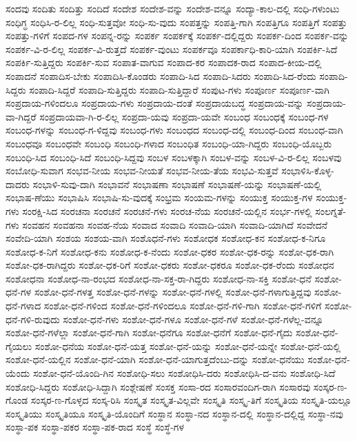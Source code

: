 {ಸಂದವು
ಸಂದಿತು
ಸಂದಿತ್ತು
ಸಂದಿದೆ
ಸಂದೇಶ
ಸಂದೇಶ-ವನ್ನು
ಸಂದೇಶ-ವನ್ನೂ
ಸಂದ್ಯಾ-ಕಾಲ-ದಲ್ಲಿ
ಸಂಧಿ-ಗಳುಂಟು
ಸಂಧಿಗ್ಧ
ಸಂಧಿಸಿ-ರ-ಲಿಲ್ಲ
ಸಂಧಿ-ಸುತ್ತವೋ
ಸಂಧಿ-ಸು-ವುದು
ಸಂಪತ್ತನ್ನು
ಸಂಪತ್ತಿ-ಗಾಗಿ
ಸಂಪತ್ತಿಗೂ
ಸಂಪತ್ತಿಗೆ
ಸಂಪತ್ತು
ಸಂಪತ್ತು-ಗಳಿಗೆ
ಸಂಪದ-ಗಳ
ಸಂಪನ್ನ-ರನ್ನು
ಸಂಪರ್ಕ
ಸಂಪರ್ಕಕ್ಕೆ
ಸಂಪರ್ಕ-ದಲ್ಲಿದ್ದರು
ಸಂಪರ್ಕ-ದಿಂದ
ಸಂಪರ್ಕ-ವನ್ನು
ಸಂಪರ್ಕ-ವಿ-ರ-ಲಿಲ್ಲ
ಸಂಪರ್ಕ-ವಿ-ರುತ್ತದೆ
ಸಂಪರ್ಕ-ವುಂಟು
ಸಂಪರ್ಕವೂ
ಸಂಪರ್ಕಾಧಿ-ಕಾರಿ-ಯಾಗಿ
ಸಂಪರ್ಕಿ-ಸಿದೆ
ಸಂಪರ್ಕಿ-ಸುತ್ತಿದ್ದರು
ಸಂಪರ್ಕಿ-ಸುವ
ಸಂಪಾತ-ವಾಗುವ
ಸಂಪಾದ-ಕರ
ಸಂಪಾದಕ-ರಾದ
ಸಂಪಾದ-ಕೀಯ-ದಲ್ಲಿ
ಸಂಪಾದನೆ
ಸಂಪಾದಿಸ-ಬೇಕು
ಸಂಪಾದಿಸಿ-ಕೊಂಡರು
ಸಂಪಾದಿ-ಸಿದ
ಸಂಪಾದಿ-ಸಿದರು
ಸಂಪಾದಿ-ಸಿದ-ರೆಂದು
ಸಂಪಾದಿ-ಸಿದ್ದರು
ಸಂಪಾದಿ-ಸಿದ್ದರೆ
ಸಂಪಾದಿ-ಸುತ್ತಿದ್ದರು
ಸಂಪಾದಿ-ಸುತ್ತಿದ್ದಾರೆ
ಸಂಪುಟ-ಗಳು
ಸಂಪೂರ್ಣ
ಸಂಪೂರ್ಣ-ವಾಗಿ
ಸಂಪ್ರದಾಯ-ಗಳಿಂದಲೂ
ಸಂಪ್ರದಾಯ-ಗಳು
ಸಂಪ್ರದಾಯ-ದಂತೆ
ಸಂಪ್ರದಾಯಬದ್ಧ
ಸಂಪ್ರದಾಯ-ವನ್ನು
ಸಂಪ್ರದಾಯ-ವಾ-ಗಿದ್ದರೆ
ಸಂಪ್ರದಾಯವಾ-ಗಿ-ರ-ಲಿಲ್ಲ
ಸಂಪ್ರದಾ-ಯವು
ಸಂಪ್ರದಾ-ಯವೇ
ಸಂಬಂಧ
ಸಂಬಂಧಕ್ಕೆ
ಸಂಬಂಧ-ಗಳ
ಸಂಬಂಧ-ಗಳನ್ನು
ಸಂಬಂಧ-ಗ-ಳಿದ್ದವು
ಸಂಬಂಧ-ಗಳು
ಸಂಬಂಧದ
ಸಂಬಂಧ-ದಲ್ಲಿ
ಸಂಬಂಧ-ದಿಂದ
ಸಂಬಂಧ-ವಾಗಿ
ಸಂಬಂಧವೂ
ಸಂಬಂಧವೇ
ಸಂಬಂಧಿ
ಸಂಬಂಧಿ-ಗಳಾದ
ಸಂಬಂಧಿತ
ಸಂಬಂಧಿ-ಯಾ-ಗಿದ್ದರು
ಸಂಬಂಧಿ-ಯೊಬ್ಬರು
ಸಂಬಂಧಿ-ಸಿದ
ಸಂಬಂಧಿ-ಸಿದೆ
ಸಂಬಂಧಿ-ಸಿದ್ದವು
ಸಂಬಳ
ಸಂಬಳಕ್ಕಾಗಿ
ಸಂಬಳ-ವನ್ನು
ಸಂಬಳ-ವಿ-ರ-ಲಿಲ್ಲ
ಸಂಬಳವು
ಸಂಬೋಧಿ-ಸುವಾಗ
ಸಂಭವ-ನೀಯ
ಸಂಭವ-ನೀಯತೆ
ಸಂಭವ-ನೀಯ-ತೆಯ
ಸಂಭವಿ-ಸುತ್ತವೆ
ಸಂಭಾಳಿಸಿ-ಕೊಳ್ಳ-ದಾದರು
ಸಂಭಾಳಿ-ಸುವು-ದಾಗಿ
ಸಂಭಾವನೆ
ಸಂಭಾಷಣಾ
ಸಂಭಾಷಣೆ
ಸಂಭಾಷಣೆ-ಯನ್ನು
ಸಂಭಾಷಣೆ-ಯಲ್ಲಿ
ಸಂಭಾಷ-ಣೆಯು
ಸಂಭಾಷಿಸಿ
ಸಂಭಾಷಿ-ಸು-ವುದಕ್ಕೆ
ಸಂಭ್ರಮ
ಸಂಯಮ-ಗಳನ್ನು
ಸಂಯುಕ್ತ
ಸಂಯುಕ್ತ-ಗಳ
ಸಂಯುಕ್ತ-ಗಳು
ಸಂರಕ್ಷಿ-ಸಿದ
ಸಂರಚನಾ
ಸಂರಚನೆ
ಸಂರಚನೆ-ಗಳು
ಸಂರಚ-ನೆಯ
ಸಂರಚನೆ-ಯಲ್ಲಿನ
ಸಂರ್ಭ-ಗಳಲ್ಲಿ
ಸಂಲಗ್ನತೆ-ಗಳು
ಸಂವಹನ
ಸಂವಹನಾ
ಸಂವಹ-ನೆಯ
ಸಂವಾದ
ಸಂವಾದಿ
ಸಂವಾದಿ-ಯಾಗಿ
ಸಂವಾದಿ-ಯಾಗಿದೆ
ಸಂವೇದನೆ
ಸಂವೇದಿ-ಯಾಗಿ
ಸಂಶಯ
ಸಂಶಯ-ವಾಗಿ
ಸಂಶೊಧನೆ-ಗಳು
ಸಂಶೋಧಕ
ಸಂಶೋಧ-ಕನ
ಸಂಶೋಧ-ಕ-ನಿಗೂ
ಸಂಶೋಧ-ಕ-ನಿಗೆ
ಸಂಶೋಧ-ಕನು
ಸಂಶೋಧ-ಕ-ನೆಂದು
ಸಂಶೋ-ಧಕರ
ಸಂಶೋ-ಧಕ-ರನ್ನು
ಸಂಶೋ-ಧಕ-ರಾಗಿ
ಸಂಶೋ-ಧಕ-ರಾಗಿದ್ದರು
ಸಂಶೋ-ಧಕ-ರಿಗೆ
ಸಂಶೋ-ಧಕರು
ಸಂಶೋ-ಧಕರೂ
ಸಂಶೋ-ಧಕ-ರೆಂದು
ಸಂಶೋಧನ
ಸಂಶೋಧನಾ
ಸಂಶೋಧ-ನಾ-ರಂಭದ
ಸಂಶೋಧ-ನಾ-ಸಕ್ತ-ರಾ-ಗಿದ್ದರು
ಸಂಶೋಧ-ನಾ-ಸಕ್ತಿ
ಸಂಶೋ-ಧನೆ
ಸಂಶೋ-ಧನೆ-ಗಳ
ಸಂಶೋ-ಧನೆ-ಗಳತ್ತ
ಸಂಶೋ-ಧನೆ-ಗಳನ್ನು
ಸಂಶೋ-ಧನೆ-ಗಳಲ್ಲಿ
ಸಂಶೋ-ಧನೆ-ಗಳಾಗುತ್ತಿದ್ದವು
ಸಂಶೋ-ಧನೆ-ಗಳಾದ
ಸಂಶೋ-ಧನೆ-ಗಳಿಂದ
ಸಂಶೋ-ಧನೆ-ಗಳಿಂದಲೂ
ಸಂಶೋ-ಧನೆ-ಗಳಿ-ಗಾಗಿ
ಸಂಶೋ-ಧನೆ-ಗಳಿಗೆ
ಸಂಶೋ-ಧನೆ-ಗಳಿ-ರುವುದು
ಸಂಶೋ-ಧನೆ-ಗಳು
ಸಂಶೋ-ಧನೆ-ಗಳೂ
ಸಂಶೋ-ಧನೆ-ಗಳೆ
ಸಂಶೋ-ಧನೆ-ಗಳೆಲ್ಲ-ವನ್ನೂ
ಸಂಶೋ-ಧನೆ-ಗಳೆಲ್ಲಾ
ಸಂಶೋ-ಧನೆ-ಗಾಗಿ
ಸಂಶೋ-ಧನೆಗೂ
ಸಂಶೋ-ಧನೆಗೆ
ಸಂಶೋ-ಧನೆ-ಗೈದು
ಸಂಶೋ-ಧನೆ-ಗೈಯಲು
ಸಂಶೋ-ಧನೆಯ
ಸಂಶೋ-ಧನೆ-ಯತ್ತ
ಸಂಶೋ-ಧನೆ-ಯನ್ನು
ಸಂಶೋ-ಧನೆ-ಯನ್ನೇ
ಸಂಶೋ-ಧನೆ-ಯಲ್ಲಿ
ಸಂಶೋ-ಧನೆ-ಯಲ್ಲಿನ
ಸಂಶೋ-ಧನೆ-ಯಾಗಿ
ಸಂಶೋ-ಧನೆ-ಯಾಗುತ್ತದೆಂಬು-ದನ್ನು
ಸಂಶೋ-ಧನೆಯು
ಸಂಶೋ-ಧನೆ-ಯೆಂದು
ಸಂಶೋ-ಧನೆ-ಯೊಂದಿ-ಗಿನ
ಸಂಶೋಧಿ-ಸಲು
ಸಂಶೋಧಿಸಿ-ದರು
ಸಂಶೋಧಿಸಿ-ದ-ವನು
ಸಂಶೋಧಿ-ಸಿದೆ
ಸಂಶೋಧಿ-ಸಿದ್ದರು
ಸಂಶೋಧಿ-ಸಿದ್ದಾಗಿ
ಸಂಶ್ಲೇಷಣೆ
ಸಂಸಕ್ತ
ಸಂಸಾ-ರದ
ಸಂಸಾರವಂದಿಗ-ರಾಗಿ
ಸಂಸಾರವು
ಸಂಸ್ಕರ-ಣ-ಗೊಂಡ
ಸಂಸ್ಕರ-ಣ-ಗೊಳ್ಳದ
ಸಂಸ್ಕ-ರಿಸಿ
ಸಂಸ್ಕೃತ
ಸಂಸ್ಕೃತ-ವಿಲ್ಲವೇ
ಸಂಸ್ಕೃತಿ
ಸಂಸ್ಕೃ-ತಿಗೆ
ಸಂಸ್ಕೃತಿಯ
ಸಂಸ್ಕೃತಿ-ಯಲ್ಲೂ
ಸಂಸ್ಕೃತಿಯು
ಸಂಸ್ಕೃತಿಯೂ
ಸಂಸ್ಕೃತಿ-ಯೊಂದಿಗೆ
ಸಂಸ್ಥಾನ
ಸಂಸ್ಥಾ-ನದ
ಸಂಸ್ಥಾನ-ದಲ್ಲಿ
ಸಂಸ್ಥಾನ-ದಲ್ಲಿದ್ದ
ಸಂಸ್ಥಾ-ನವು
ಸಂಸ್ಥಾ-ಪಕ
ಸಂಸ್ಥಾ-ಪಕರ
ಸಂಸ್ಥಾ-ಪಕ-ರಾದ
ಸಂಸ್ಥೆ
ಸಂಸ್ಥೆ-ಗಳ
}
